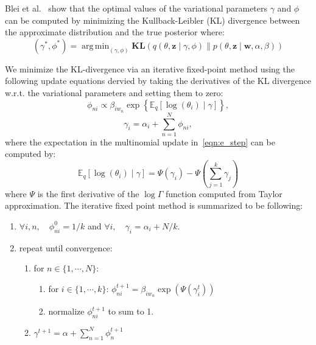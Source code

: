 \documentclass[a4paper]{article}
\DeclareMathOperator*{\argmin}{arg\,min}
\begin{document}
	 Blei et al.~\cite{blei2003latent} show that the optimal values of the variational parameters $\gamma$ and $\phi$ can be computed by minimizing the Kullback-Leibler (KL) divergence between the approximate distribution and the true posterior where:
	\begin{equation}
		(\gamma^*,\phi^*) = \argmin_{(\gamma,\phi)} \mathbf{KL}(q(\theta,\mathbf{z} \mid \gamma, \phi) \parallel p(\theta,\mathbf{z} \mid \mathbf{w},\alpha,\beta))
	\end{equation}
	
	\noindent We minimize the KL-divergence via an iterative fixed-point method using the following update equations dervied by taking the derivatives of the KL divergence w.r.t. the variational parameters and setting them to zero: 
	\begin{equation}
		\phi_{ni} \propto \beta_{iw_n} \exp\left\{\mathbb{E}_q\left[\log{(\theta_i)}  \mid \gamma\right]\right\},
		\label{eqn:e_step}
	\end{equation}
	\begin{equation}
		\gamma_i = \alpha_i + \textstyle \sum_{n=1}^N \phi_{ni},
		\label{eqn:m_step}
	\end{equation}
	where the expectation in the multinomial update in~\ref{eqn:e_step} can be computed by: 
	\begin{equation}
	\mathbb{E}_q\left[\log{(\theta_i)}  \mid \gamma \right] = \Psi(\gamma_i)-\Psi\left(\sum_{j=1}^k \gamma_j\right)
	\label{eqn:expectation}
	\end{equation}
	where $\Psi$ is the first derivative of the $\log\Gamma$ function computed from Taylor approximation. The iterative fixed point method is summarized to be following:
	\begin{enumerate}[noitemsep]
		\item $\forall i,n, \quad \phi^0_{ni} = 1/k$ and $\forall i, \quad \gamma_i = \alpha_i + N / k$.
		\item repeat until convergence: 
		\begin{enumerate}[noitemsep]
			\item for $n \in \{1, \cdots, N\}$:
			\begin{enumerate}[noitemsep]
				\item for $i \in \{1,\cdots, k\}$: $\phi_{ni}^{t+1} = \beta_{iw_n} \operatorname{exp}\left(\Psi(\gamma^t_i)\right)$
				\item normalize $\phi_{ni}^{t+1}$ to sum to 1.
			\end{enumerate}
			\item $\gamma^{t+1} = \alpha + \sum_{n=1}^N\phi^{t+1}_n$
		\end{enumerate}
	\end{enumerate}
	
\end{document}
